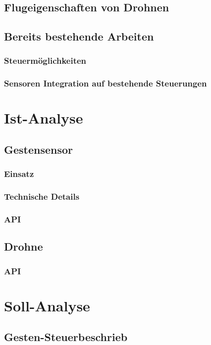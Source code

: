 \subsection{Flugeigenschaften von Drohnen}



\subsection{Bereits bestehende Arbeiten}

\subsubsection{Steuermöglichkeiten}

\subsubsection{Sensoren Integration auf bestehende Steuerungen}


\section{Ist-Analyse}
\subsection{Gestensensor}

\subsubsection{Einsatz}

\subsubsection{Technische Details}

\subsubsection{API}


\subsection{Drohne}

\subsubsection{API}


\section{Soll-Analyse}
\subsection{Gesten-Steuerbeschrieb}


